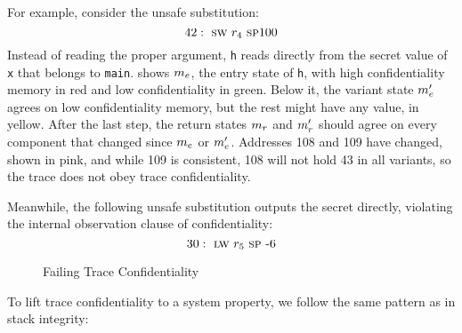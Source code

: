 \documentclass[acmsmall,review,anonymous]{acmart}\settopmatter{printfolios=true,printccs=false,printacmref=false}
\begin{document}
For example, consider the unsafe substitution:
\[
42 : ~ \textsc{sw} ~ r_4 ~ \textsc{sp} 100
\]
Instead of reading the proper argument, {\tt h} reads directly from the
secret value of {\tt x} that belongs to {\tt main}. 
shows \(m_e\), the entry state of {\tt h}, with high confidentiality memory
in red and low confidentiality in green. Below it, the variant state
\(m_e'\) agrees on low confidentiality memory, but the rest might have
any value, in yellow. After the last step, the return states \(m_r\) and
\(m_r'\) should agree on every component that changed since \(m_e\) or
\(m_e'\). Addresses 108 and 109 have changed, shown in pink, and while 109
is consistent, 108 will not hold 43 in all variants, so the trace does not obey
trace confidentiality.

Meanwhile, the following unsafe substitution outputs the secret
directly, violating the internal observation clause of confidentiality:
\[
30 : ~ \textsc{lw} ~ r_5 ~ \textsc{sp} ~ \textrm{-} 6
\]

\begin{figure}
  \confidentialityendexample
  \caption{Failing Trace Confidentiality}
  \label{fig:confex}
\end{figure}


To lift trace confidentiality to a system property, we follow the same
pattern as in stack integrity:
\end{document}
